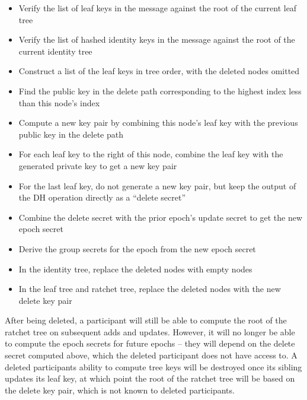\documentclass[11pt, oneside]{article}
\begin{document}
\begin{itemize}
\item{Verify the list of leaf keys in the message against the root of the current leaf tree}
\item{Verify the list of hashed identity keys in the message against the root of the current identity tree}
\item{Construct a list of the leaf keys in tree order, with the deleted nodes omitted}
\item{Find the public key in the delete path corresponding to the highest index less than this node's index}
\item{Compute a new key pair by combining this node's leaf key with the previous public key in the delete path}
\item{For each leaf key to the right of this node, combine the leaf key with the generated private key to get a new key pair}
\item{For the last leaf key, do not generate a new key pair, but keep the output of the DH operation directly as a ``delete secret''}
\item{Combine the delete secret with the prior epoch's update secret to get the new epoch secret}
\item{Derive the group secrets for the epoch from the new epoch secret}
\item{In the identity tree, replace the deleted nodes with empty nodes}
\item{In the leaf tree and ratchet tree, replace the deleted nodes with the new delete key pair}
\end{itemize}

After being deleted, a participant will still be able to compute the root of the ratchet tree on subsequent adds and updates.  However, it will no longer be able to compute the epoch secrets for future epochs -- they will depend on the delete secret computed above, which the deleted participant does not have access to.  A deleted participants ability to compute tree keys will be destroyed once its sibling updates its leaf key, at which point the root of the ratchet tree will be based on the delete key pair, which is not known to deleted participants.
\end{document}
